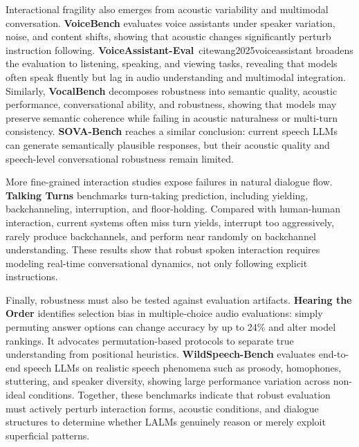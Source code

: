 Interactional fragility also emerges from acoustic variability and multimodal conversation. \textbf{VoiceBench} \cite{chen2026voicebench} evaluates voice assistants under speaker variation, noise, and content shifts, showing that acoustic changes significantly perturb instruction following. \textbf{VoiceAssistant-Eval}\ cite{wang2025voiceassistant} broadens the evaluation to listening, speaking, and viewing tasks, revealing that models often speak fluently but lag in audio understanding and multimodal integration. Similarly, \textbf{VocalBench} \cite{liu2025vocalbench} decomposes robustness into semantic quality, acoustic performance, conversational ability, and robustness, showing that models may preserve semantic coherence while failing in acoustic naturalness or multi-turn consistency. \textbf{SOVA-Bench} \cite{hou2025sova} reaches a similar conclusion: current speech LLMs can generate semantically plausible responses, but their acoustic quality and speech-level conversational robustness remain limited.

More fine-grained interaction studies expose failures in natural dialogue flow. \textbf{Talking Turns} \cite{arora2025talking} benchmarks turn-taking prediction, including yielding, backchanneling, interruption, and floor-holding. Compared with human-human interaction, current systems often miss turn yields, interrupt too aggressively, rarely produce backchannels, and perform near randomly on backchannel understanding. These results show that robust spoken interaction requires modeling real-time conversational dynamics, not only following explicit instructions.

Finally, robustness must also be tested against evaluation artifacts. \textbf{Hearing the Order} \cite{lin2025hearing} identifies selection bias in multiple-choice audio evaluations: simply permuting answer options can change accuracy by up to 24\% and alter model rankings. It advocates permutation-based protocols to separate true understanding from positional heuristics. \textbf{WildSpeech-Bench} \cite{zhang2025wildspeechbench} evaluates end-to-end speech LLMs on realistic speech phenomena such as prosody, homophones, stuttering, and speaker diversity, showing large performance variation across non-ideal conditions. Together, these benchmarks indicate that robust evaluation must actively perturb interaction forms, acoustic conditions, and dialogue structures to determine whether LALMs genuinely reason or merely exploit superficial patterns.


